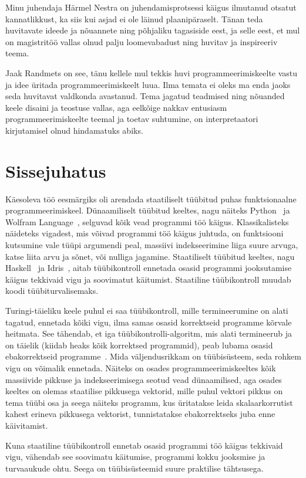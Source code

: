 \documentclass[12pt]{article}
\newcommand\peatykk[1]{
  \clearpage
  \section{#1}}
\begin{document}
    Minu juhendaja Härmel Nestra on juhendamisprotsessi käigus ilmutanud otsatut kannatlikkust, ka siis kui asjad ei ole läinud plaanipäraselt. Tänan teda huvitavate ideede ja nõuannete ning põhjaliku tagasiside eest, ja selle eest, et mul on magistritöö vallas olnud palju loomevabadust ning huvitav ja inspireeriv teema.

    Jaak Randmets on see, tänu kellele mul tekkis huvi programmeerimiskeelte vastu ja idee üritada programmeerimiskeelt luua. Ilma temata ei oleks ma enda jaoks seda huvitavat valdkonda avastanud. Tema jagatud teadmised ning nõuanded keele disaini ja teostuse vallas, aga eelkõige nakkav entusiasm programmeerimiskeelte teemal ja toetav suhtumine, on interpretaatori kirjutamisel olnud hindamatuks abiks.
  \peatykk{Sissejuhatus}
    Käesoleva töö eesmärgiks oli arendada staatiliselt tüübitud puhas funktsionaalne programmeerimiskeel. Dünaamiliselt tüübitud keeltes, nagu näiteks Python~\cite{Pyt} ja Wolfram Language~\cite{Wol}, selguvad kõik vead programmi töö käigus. Klassikalisteks näideteks vigadest, mis võivad programmi töö käigus juhtuda, on funktsiooni kutsumine vale tüüpi argumendi peal, massiivi indekseerimine liiga suure arvuga, katse liita arvu ja sõnet, või nulliga jagamine. Staatiliselt tüübitud keeltes, nagu Haskell~\cite{Has} ja Idris~\cite{The_Idr}, aitab tüübikontroll ennetada osasid programmi jooksutamise käigus tekkivaid vigu ja soovimatut käitumist. Staatiline tüübikontroll muudab koodi tüübiturvalisemaks.

    Turingi-täieliku keele puhul ei saa tüübikontroll, mille termineerumine on alati tagatud, ennetada kõiki vigu, ilma samas osasid korrektseid programme kõrvale heitmata. See tähendab, et iga tüübikontrolli-algoritm, mis alati termineerub ja on täielik (kiidab heaks kõik korrektsed programmid), peab lubama osasid ebakorrektseid programme~\cite{Typ}. Mida väljendusrikkam on tüübisüsteem, seda rohkem vigu on võimalik ennetada. Näiteks on osades programmeerimiskeeltes kõik massiivide pikkuse ja indekseerimisega seotud vead dünaamilised, aga osades keeltes on olemas staatilise pikkusega vektorid, mille puhul vektori pikkus on tema tüübi osa ja seega näiteks programm, kus üritatakse leida skalaarkorrutist kahest erineva pikkusega vektorist, tunnistatakse ebakorrektseks juba enne käivitamist.

    Kuna staatiline tüübikontroll ennetab osasid programmi töö käigus tekkivaid vigu, vähendab see soovimatu käitumise, programmi kokku jooksmise ja turvaaukude ohtu. Seega on tüübisüsteemid suure praktilise tähtsusega.
\end{document}
